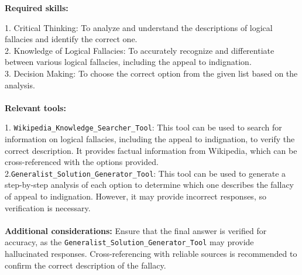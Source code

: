 \begin{plannerbox}

\textbf{Required skills:}

1. Critical Thinking: To analyze and understand the descriptions of logical fallacies and identify the correct one.\\
2. Knowledge of Logical Fallacies: To accurately recognize and differentiate between various logical fallacies, including the appeal to indignation.\\
3. Decision Making: To choose the correct option from the given list based on the analysis.
\\\\
\textbf{Relevant tools:}

1. \texttt{Wikipedia\_Knowledge\_Searcher\_Tool}: This tool can be used to search for information on logical fallacies, including the appeal to indignation, to verify the correct description. It provides factual information from Wikipedia, which can be cross-referenced with the options provided. \\
2.\texttt{Generalist\_Solution\_Generator\_Tool}: This tool can be used to generate a step-by-step analysis of each option to determine which one describes the fallacy of appeal to indignation. However, it may provide incorrect responses, so verification is necessary.
\\\\
\textbf{Additional considerations:}
Ensure that the final answer is verified for accuracy, as the \texttt{Generalist\_Solution\_Generator\_Tool} may provide hallucinated responses. Cross-referencing with reliable sources is recommended to confirm the correct description of the fallacy.
\end{plannerbox}


